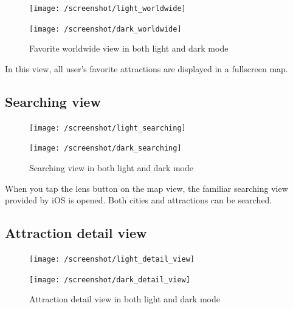 \documentclass[a4paper, 11pt, parskip=half]{scrreprt}
\theoremstyle{definition}
\begin{document}
\begin{figure}[H]
	\centering
	\begin{minipage}{.5\textwidth}
  	\centering
  	\texttt{[image: /screenshot/light\_worldwide]}
  	\label{fig:test1}
	\end{minipage}%
	\begin{minipage}{.5\textwidth}
  	\centering
  	\texttt{[image: /screenshot/dark\_worldwide]}
  	\label{fig:test2}
	\end{minipage}
	\caption{Favorite worldwide view in both light and dark mode}
\end{figure}

In this view, all user's favorite attractions are displayed in a fullscreen map. 

\subsection{Searching view}

\begin{figure}[H]
	\centering
	\begin{minipage}{.5\textwidth}
  	\centering
  	\texttt{[image: /screenshot/light\_searching]}
  	\label{fig:test1}
	\end{minipage}%
	\begin{minipage}{.5\textwidth}
  	\centering
  	\texttt{[image: /screenshot/dark\_searching]}
  	\label{fig:test2}
	\end{minipage}
	\caption{Searching view in both light and dark mode}
\end{figure}

When you tap the lens button on the map view, the familiar searching view provided by iOS is opened. Both cities and attractions can be searched.

\subsection{Attraction detail view}

\begin{figure}[H]
	\centering
	\begin{minipage}{.5\textwidth}
  	\centering
  	\texttt{[image: /screenshot/light\_detail\_view]}
  	\label{fig:test1}
	\end{minipage}%
	\begin{minipage}{.5\textwidth}
  	\centering
  	\texttt{[image: /screenshot/dark\_detail\_view]}
  	\label{fig:test2}
	\end{minipage}
	\caption{Attraction detail view in both light and dark mode}
\end{figure}
\end{document}
